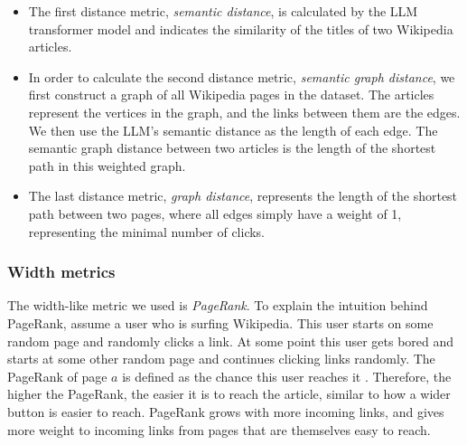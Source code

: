 \begin{itemize}
\item
The first distance metric, \emph{semantic distance}, is calculated by the LLM transformer model and indicates the similarity of the titles of two Wikipedia articles.

\item
In order to calculate the second distance metric, \emph{semantic graph distance}, we first construct a graph of all Wikipedia pages in the dataset. The articles represent the vertices in the graph, and the links between them are the edges. We then use the LLM's semantic distance as the length of each edge. The semantic graph distance between two articles is the length of the shortest path in this weighted graph.

\item
The last distance metric, \emph{graph distance}, represents the length of the shortest path between two pages, where all edges simply have a weight of 1, representing the minimal number of clicks.
\end{itemize}


\subsubsection{Width metrics}
The width-like metric we used is \emph{PageRank}. To explain the intuition behind PageRank, assume a user who is surfing Wikipedia. This user starts on some random page and randomly clicks a link.
At some point this user gets bored and starts at some other random page and continues clicking links randomly.
The PageRank of page $a$ is defined as the chance this user reaches it \cite{Brin1998Anatomy}.
Therefore, the higher the PageRank, the easier it is to reach the article, similar to how a wider button is easier to reach. PageRank grows with more incoming links, and gives more weight to incoming links from pages that are themselves easy to reach.

